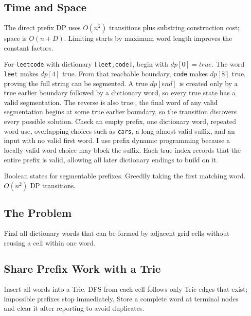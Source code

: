 \subsection{Time and Space}
The direct prefix DP uses \(O(n^2)\) transitions plus substring construction
cost; space is \(O(n+D)\). Limiting starts by maximum word length improves the
constant factors.

\lessonexpansion
  {For \texttt{leetcode} with dictionary \texttt{[leet,code]}, begin with
   \(dp[0]=true\). The word \texttt{leet} makes \(dp[4]\) true. From that
   reachable boundary, \texttt{code} makes \(dp[8]\) true, proving the full
   string can be segmented.}
  {A true \(dp[end]\) is created only by a true earlier boundary followed by a
   dictionary word, so every true state has a valid segmentation. The reverse is also true:,
   the final word of any valid segmentation begins at some true earlier
   boundary, so the transition discovers every possible solution.}
  {Check an empty prefix, one dictionary word, repeated word use, overlapping
   choices such as \texttt{cars}, a long almost-valid suffix, and an input
   with no valid first word.}
  {I use prefix dynamic programming because a locally valid word choice may
   block the suffix. Each true index records that the entire prefix is valid,
   allowing all later dictionary endings to build on it.}

  {Boolean states for segmentable prefixes.}
  {Greedily taking the first matching word.}{$O(n^2)$ DP transitions.}



\subsection{The Problem}
Find all dictionary words that can be formed by adjacent grid cells without
reusing a cell within one word.

\subsection{Share Prefix Work with a Trie}
Insert all words into a Trie. DFS from each cell follows only Trie edges that
exist; impossible prefixes stop immediately. Store a complete word at terminal
nodes and clear it after reporting to avoid duplicates.

